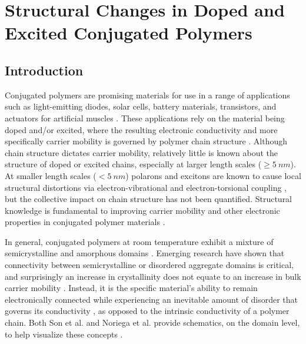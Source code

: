 %
\chapter{Structural Changes in Doped and Excited Conjugated Polymers}

\section{Introduction}

Conjugated polymers are promising materials for use in a range of applications such as light-emitting diodes, solar cells, battery materials, transistors, and actuators for artificial muscles \cite{Swager2017}. These applications rely on the material being doped and/or excited, where the resulting electronic conductivity and more specifically carrier mobility is governed by polymer chain structure \cite{Noriega2013a, Noriega2013}. Although chain structure dictates carrier mobility, relatively little is known about the structure of doped or excited chains, especially at larger length scales ($\geq 5 \ nm$). At smaller length scales ($< 5 \ nm$) polarons and excitons are known to cause local structural distortions via electron-vibrational and electron-torsional coupling \cite{Tapping2014, Zhou2015, Yu2012, Busby2011}, but the collective impact on chain structure has not been quantified. Structural knowledge is fundamental to improving carrier mobility and other electronic properties in conjugated polymer materials \cite{Beaujuge2011, Kuei2017}.

In general, conjugated polymers at room temperature exhibit a mixture of semicrystalline and amorphous domains \cite{Shen2016}. Emerging research have shown that connectivity between semicrystalline or disordered aggregate domains is critical, and surprisingly an increase in crystallinity does not equate to an increase in bulk carrier mobility \cite{Son2016, Noriega2013}. Instead, it is the specific material's ability to remain electronically connected while experiencing an inevitable amount of disorder that governs its conductivity \cite{Noriega2013}, as opposed to the intrinsic conductivity of a polymer chain. Both Son et al. and Noriega et al. provide schematics, on the domain level, to help visualize these concepts \cite{Son2016, Noriega2013}.

